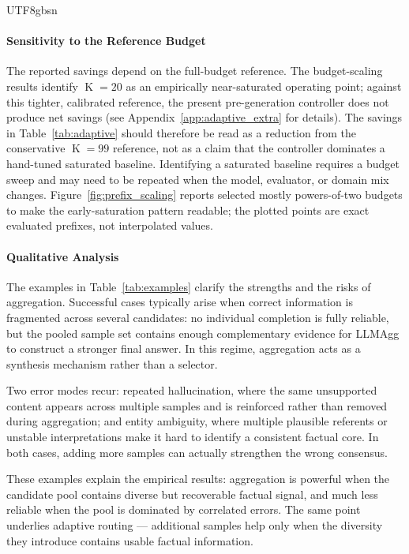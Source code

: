 \documentclass[11pt]{article}
\begin{document}
\begin{CJK*}{UTF8}{gbsn}
\paragraph{Sensitivity to the Reference Budget} The reported savings depend on the full-budget reference. The budget-scaling results identify $\operatorname{K}=20$ as an empirically near-saturated operating point; against this tighter, calibrated reference, the present pre-generation controller does not produce net savings (see Appendix~\ref{app:adaptive_extra} for details). The savings in Table~\ref{tab:adaptive} should therefore be read as a reduction from the conservative $\operatorname{K}=99$ reference, not as a claim that the controller dominates a hand-tuned saturated baseline. Identifying a saturated baseline requires a budget sweep and may need to be repeated when the model, evaluator, or domain mix changes. Figure~\ref{fig:prefix_scaling} reports selected mostly powers-of-two budgets to make the early-saturation pattern readable; the plotted points are exact evaluated prefixes, not interpolated values.

\paragraph{Qualitative Analysis}
\label{sec:qualitative}

The examples in Table~\ref{tab:examples} clarify the strengths and the risks of aggregation. Successful cases typically arise when correct information is fragmented across several candidates: no individual completion is fully reliable, but the pooled sample set contains enough complementary evidence for LLMAgg to construct a stronger final answer. In this regime, aggregation acts as a synthesis mechanism rather than a selector. 

Two error modes recur: repeated hallucination, where the same unsupported content appears across multiple samples and is reinforced rather than removed during aggregation; and entity ambiguity, where multiple plausible referents or unstable interpretations make it hard to identify a consistent factual core. In both cases, adding more samples can actually strengthen the wrong consensus.

These examples explain the empirical results: aggregation is powerful when the candidate pool contains diverse but recoverable factual signal, and much less reliable when the pool is dominated by correlated errors. The same point underlies adaptive routing — additional samples help only when the diversity they introduce contains usable factual information.


\end{CJK*}
\end{document}
